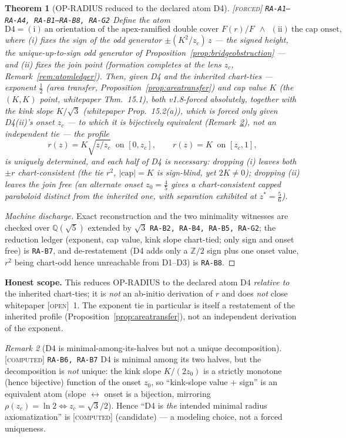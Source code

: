 \documentclass[11pt]{article}
\newcommand{\tagF}{\textcolor{cF}{\textsc{[forced]}}}
\newcommand{\tagC}{\textcolor{cC}{\textsc{[computed]}}}
\newcommand{\tagO}{\textcolor{cO}{\textsc{[open]}}}
\newcommand{\hx}[1]{\textcolor{cC}{\footnotesize\texttt{#1}}}
\newcommand{\Q}{\mathbb{Q}}
\newcommand{\Z}{\mathbb{Z}}
\theoremstyle{plain}
\newtheorem{theorem}{Theorem}[section]
\theoremstyle{definition}
\theoremstyle{remark}
\newtheorem{remark}[theorem]{Remark}
\begin{document}
\begin{theorem}[OP-RADIUS reduced to the declared atom D4]\label{thm:d4reduction}\tagF{} \hx{RA-A1--RA-A4, RA-B1--RA-B8, RA-G2}
Define the atom
\[
\text{D4}=(\text{i})\ \text{an orientation of the apex-ramified double cover }
F(r)/F\ \ \wedge\ \ (\text{ii})\ \text{the cap onset,}
\]
where (i) fixes the sign of the odd generator $\pm(K^2/z_c)\,z$ --- the signed
height, the unique-up-to-sign odd generator of
Proposition~\ref{prop:bridgeobstruction} --- and (ii) fixes the join point
(formation completes at the lens $z_c$, Remark~\ref{rem:atomledger}). Then,
\emph{given} D4 and the inherited chart-ties --- exponent $\tfrac12$ (area
transfer, Proposition~\ref{prop:areatransfer}) and cap value $K$ (the $(K,K)$
point, whitepaper Thm.~15.1), both v1.8-forced \emph{absolutely}, together with the
kink slope $K/\sqrt3$ (whitepaper Prop.~15.2(a)), which is forced only \emph{given}
D4(ii)'s onset $z_c$ --- to which it is bijectively equivalent
(Remark~\ref{rem:d4candidate}), not an independent tie --- the profile
\[
r(z)=K\sqrt{z/z_c}\ \text{ on }[0,z_c],\qquad r(z)=K\ \text{ on }[z_c,1],
\]
is \emph{uniquely} determined, and each half of D4 is \emph{necessary}: dropping
(i) leaves both $\pm r$ chart-consistent (the tie $r^2$, $|\mathrm{cap}|=K$ is
sign-blind, yet $2K\neq0$); dropping (ii) leaves the join free (an alternate
onset $z_0=\tfrac45$ gives a chart-consistent capped paraboloid distinct from the
inherited one, with separation exhibited at $z^*=\tfrac56$).
\end{theorem}

\begin{proof}[Machine discharge]
Exact reconstruction and the two minimality witnesses are checked over
$\Q(\sqrt5)$ extended by $\sqrt3$ \hx{RA-B2, RA-B4, RA-B5, RA-G2}; the reduction
ledger (exponent, cap value, kink slope chart-tied; only sign and onset free) is
\hx{RA-B7}, and de-restatement (D4 adds only a $\Z/2$ sign plus one onset value,
$r^2$ being chart-odd hence unreachable from D1--D3) is \hx{RA-B8}.
\end{proof}

\smallskip\noindent
\textbf{Honest scope.} This reduces OP-RADIUS to the declared atom D4
\emph{relative to} the inherited chart-ties; it is \emph{not} an ab-initio
derivation of $r$ and does \emph{not} close whitepaper \tagO{}~1. The exponent
tie in particular is itself a restatement of the inherited profile
(Proposition~\ref{prop:areatransfer}), not an independent derivation of the
exponent.

\begin{remark}[D4 is minimal-among-its-halves but not a unique decomposition]\label{rem:d4candidate}\tagC{} \hx{RA-B6, RA-B7}
D4 is minimal among its two halves, but the decomposition is \emph{not} unique:
the kink slope $K/(2z_0)$ is a strictly monotone (hence bijective) function of
the onset $z_0$, so ``kink-slope value $+$ sign'' is an equivalent atom (slope
$\leftrightarrow$ onset is a bijection, mirroring $\rho(z_c)=\ln2\iff
z_c=\sqrt3/2$). Hence ``D4 is \emph{the} intended minimal radius axiomatization''
is \tagC{} (candidate) --- a modeling choice, not a forced uniqueness.
\end{remark}
\end{document}
